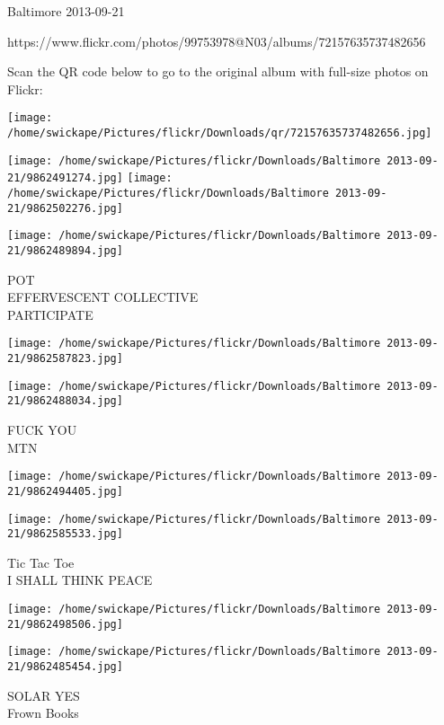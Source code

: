 \documentclass[10pt,letterpaper]{article}
\begin{document}
Baltimore 2013-09-21

https://www.flickr.com/photos/99753978@N03/albums/72157635737482656

Scan the QR code below to go to the original album with full-size photos on Flickr:

\texttt{[image: /home/swickape/Pictures/flickr/Downloads/qr/72157635737482656.jpg]}
\pagebreak

\texttt{[image: /home/swickape/Pictures/flickr/Downloads/Baltimore 2013-09-21/9862491274.jpg]}
\texttt{[image: /home/swickape/Pictures/flickr/Downloads/Baltimore 2013-09-21/9862502276.jpg]}

\texttt{[image: /home/swickape/Pictures/flickr/Downloads/Baltimore 2013-09-21/9862489894.jpg]}

POT\\
EFFERVESCENT COLLECTIVE\\
PARTICIPATE\\
\pagebreak

\texttt{[image: /home/swickape/Pictures/flickr/Downloads/Baltimore 2013-09-21/9862587823.jpg]}

\vspace{0.25in}
\texttt{[image: /home/swickape/Pictures/flickr/Downloads/Baltimore 2013-09-21/9862488034.jpg]}

FUCK YOU\\
MTN\\
\pagebreak

\texttt{[image: /home/swickape/Pictures/flickr/Downloads/Baltimore 2013-09-21/9862494405.jpg]}

\vspace{0.25in}
\texttt{[image: /home/swickape/Pictures/flickr/Downloads/Baltimore 2013-09-21/9862585533.jpg]}

Tic Tac Toe\\
I SHALL THINK PEACE\\
\pagebreak

\texttt{[image: /home/swickape/Pictures/flickr/Downloads/Baltimore 2013-09-21/9862498506.jpg]}

\vspace{0.25in}
\texttt{[image: /home/swickape/Pictures/flickr/Downloads/Baltimore 2013-09-21/9862485454.jpg]}

SOLAR YES\\
Frown Books\\
\pagebreak
\end{document}
